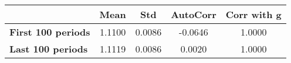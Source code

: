 \begin{tiny}\begin{tabular}{|l|c|c|c|c|}
\hline
&\textbf{Mean}&\textbf{Std}&\textbf{AutoCorr}&\textbf{Corr with g}\\\hline
\textbf{First 100 periods}&1.1100&0.0086&-0.0646&1.0000\\\hline
\textbf{Last 100 periods}&1.1119&0.0086&0.0020&1.0000\\\hline
\end{tabular}
\end{tiny}